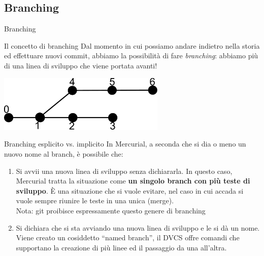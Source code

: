 \documentclass[presentation]{beamer}
\begin{document}
\subsection{Branching}

\begin{frame}{Branching}
	\begin{block}{Il concetto di branching}
		Dal momento in cui possiamo andare indietro nella storia ed effettuare nuovi commit, abbiamo la possibilità di fare \textit{branching}: abbiamo più di una linea di sviluppo che viene portata avanti!
		\begin{center}
			\includegraphics[width=0.6\textwidth]{img/branch}
		\end{center}
	\end{block}
\end{frame}

\begin{frame}{Branching esplicito vs. implicito}
	In Mercurial, a seconda che si dia o meno un nuovo nome al branch, è possibile che:
	\begin{enumerate}
		\item Si avvii una nuova linea di sviluppo senza dichiararla. In questo caso, Mercurial tratta la situazione come \textbf{un singolo branch con più teste di sviluppo}. È una situazione che si vuole evitare, nel caso in cui accada si vuole sempre riunire le teste in una unica (merge). \\ \alert{Nota}: git proibisce espressamente questo genere di branching
		\item Si dichiara che si sta avviando una nuova linea di sviluppo e le si dà un nome. Viene creato un cosiddetto ``named branch'', il DVCS offre comandi che supportano la creazione di più linee ed il passaggio da una all'altra.
	\end{enumerate}
\end{frame}
\end{document}
